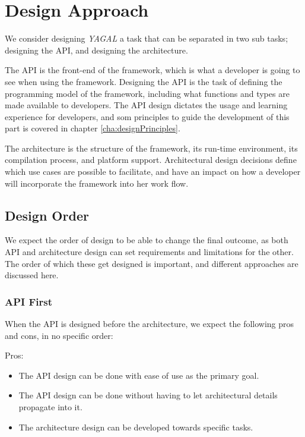 \section{Design Approach}
We consider designing \textit{YAGAL} a task that can be separated in two sub tasks; designing the API, and designing the architecture.

The API is the front-end of the framework, which is what a developer is going to see when using the framework. Designing the API is the task of defining the programming model of the framework, including what functions and types are made available to developers. The API design dictates the usage and learning experience for developers, and som principles to guide the development of this part is covered in chapter \ref{cha:designPrinciples}.

The architecture is the structure of the framework, its run-time environment, its compilation process, and platform support. Architectural design decisions define which use cases are possible to facilitate, and have an impact on how a developer will incorporate the framework into her work flow.

\subsection{Design Order}
We expect the order of design to be able to change the final outcome, as both API and architecture design can set requirements and limitations for the other. The order of which these get designed is important, and different approaches are discussed here.

\subsubsection{API First}
When the API is designed before the architecture, we expect the following pros and cons, in no specific order:

Pros:
\begin{itemize}
\item The API design can be done with ease of use as the primary goal.
\item The API design can be done without having to let architectural details propagate into it.
\item The architecture design can be developed towards specific tasks.
\end{itemize}

